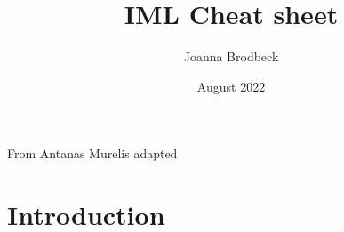 \documentclass{article}
\title{IML Cheat sheet}
\author{Joanna Brodbeck}
\date{August 2022}
\begin{document}
From Antanas Murelis adapted

\maketitle

\section{Introduction}
\end{document}
